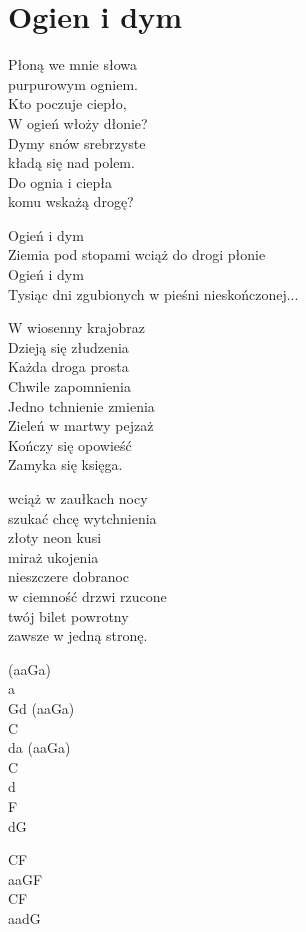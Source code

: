 \section{Ogien i dym}
\begin{text}
\hfill\break
Płoną we mnie słowa\\
purpurowym ogniem.\\
Kto poczuje ciepło,\\
W ogień włoży dłonie?\\
Dymy snów srebrzyste\\
kładą się nad polem.\\
Do ognia i ciepła\\
komu wskażą drogę?

Ogień i dym\\
Ziemia pod stopami wciąż do drogi płonie\\
Ogień i dym\\
Tysiąc dni zgubionych w pieśni nieskończonej...

W wiosenny krajobraz\\
Dzieją się złudzenia\\
Każda droga prosta\\
Chwile zapomnienia\\
Jedno tchnienie zmienia\\
Zieleń w martwy pejzaż\\
Kończy się opowieść\\
Zamyka się księga.

wciąż w zaułkach nocy\\
szukać chcę wytchnienia\\
złoty neon kusi\\
miraż ukojenia\\
nieszczere dobranoc\\
w ciemność drzwi rzucone\\
twój bilet powrotny\\
zawsze w jedną stronę.
\end{text}
\begin{chord}
(aaGa)\\
a\\
Gd (aaGa)\\
C\\
da (aaGa)\\
C\\
d\\
F\\
dG

CF\\
aaGF\\
CF\\
aadG
\end{chord}